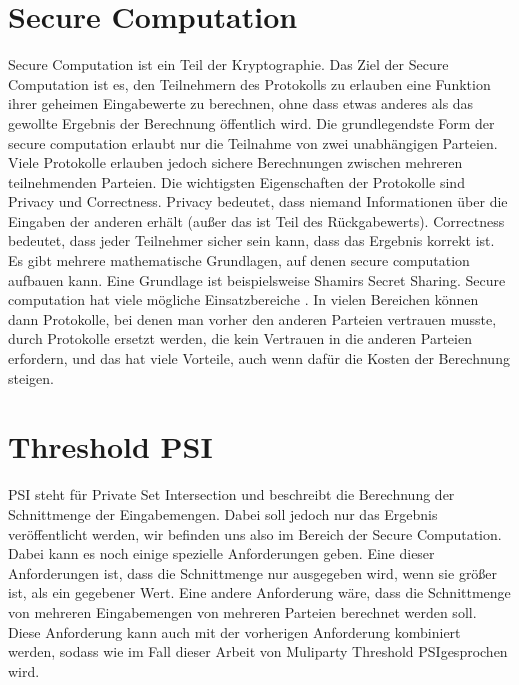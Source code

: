 \section{Secure Computation}
Secure Computation ist ein Teil der Kryptographie. Das Ziel der Secure Computation ist es, den Teilnehmern des Protokolls zu erlauben eine Funktion ihrer geheimen Eingabewerte zu berechnen, ohne dass etwas anderes als das gewollte Ergebnis der Berechnung öffentlich wird. \cite{cryptoeprint:2020:300} Die grundlegendste Form der secure computation erlaubt nur die Teilnahme von zwei unabhängigen Parteien. Viele Protokolle erlauben jedoch sichere Berechnungen zwischen mehreren teilnehmenden Parteien. Die wichtigsten Eigenschaften der Protokolle sind Privacy und Correctness. Privacy bedeutet, dass niemand Informationen über die Eingaben der anderen erhält (außer das ist Teil des Rückgabewerts). Correctness bedeutet, dass jeder Teilnehmer sicher sein kann, dass das Ergebnis korrekt ist. \cite{cryptoeprint:2020:300} Es gibt mehrere mathematische Grundlagen, auf denen secure computation aufbauen kann. Eine Grundlage ist beispielsweise Shamirs Secret Sharing. Secure computation hat viele mögliche Einsatzbereiche \cite{cryptoeprint:2020:300}. In vielen Bereichen können dann Protokolle, bei denen man vorher den anderen Parteien vertrauen musste, durch Protokolle ersetzt werden, die kein Vertrauen in die anderen Parteien erfordern, und das hat viele Vorteile, auch wenn dafür die Kosten der Berechnung steigen.

\section{Threshold PSI}
PSI steht für \glqq Private Set Intersection\grqq{} und beschreibt die Berechnung der Schnittmenge der Eingabemengen. Dabei soll jedoch nur das Ergebnis veröffentlicht werden, wir befinden uns also im Bereich der Secure Computation.
Dabei kann es noch einige spezielle Anforderungen geben. Eine dieser Anforderungen ist, dass die Schnittmenge nur ausgegeben wird, wenn sie größer ist, als ein gegebener Wert. Eine andere Anforderung wäre, dass die Schnittmenge von mehreren Eingabemengen von mehreren Parteien berechnet werden soll. 
Diese Anforderung kann auch mit der vorherigen Anforderung kombiniert werden, sodass wie im Fall dieser Arbeit von \glqq Muliparty Threshold PSI\grqq gesprochen wird.

